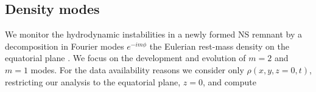 


\subsection{Density modes} \label{sec:bns_sims:method:modes}


We monitor the hydrodynamic instabilities in a newly formed \ac{NS} remnant 
by a decomposition in Fourier modes
$e^{- i m \phi}$ the Eulerian rest-mass density on the equatorial plane 
\citep[see Eq.~(1) in][]{Radice:2016gym}.
We focus on the development and evolution of $m=2$ and $m=1$ modes. 
%
%
%
%
For the data availability reasons we consider only $\rho(x,y,z=0,t)$, 
\ie{} restricting our analysis to the equatorial plane, $z=0$, and compute 

